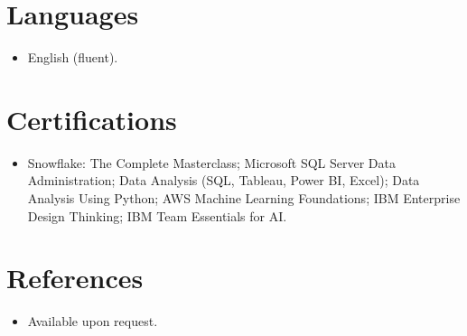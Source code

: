 \documentclass[11pt,a4paper,sans]{moderncv}
\begin{document}
\section{Languages}
\vspace{1pt}
\begin{itemize}
\item {English (fluent).}
\end{itemize}


\section{Certifications}
\vspace{1pt}
\begin{itemize}
\item {Snowflake: The Complete Masterclass; Microsoft SQL Server Data Administration; Data Analysis (SQL, Tableau, Power BI, Excel); Data Analysis Using Python; AWS Machine Learning Foundations; IBM Enterprise Design Thinking; IBM Team Essentials for AI.}
\end{itemize}


\section{References}
\vspace{1pt}
\begin{itemize}
\item{Available upon request.}
\end{itemize}
\end{document}

